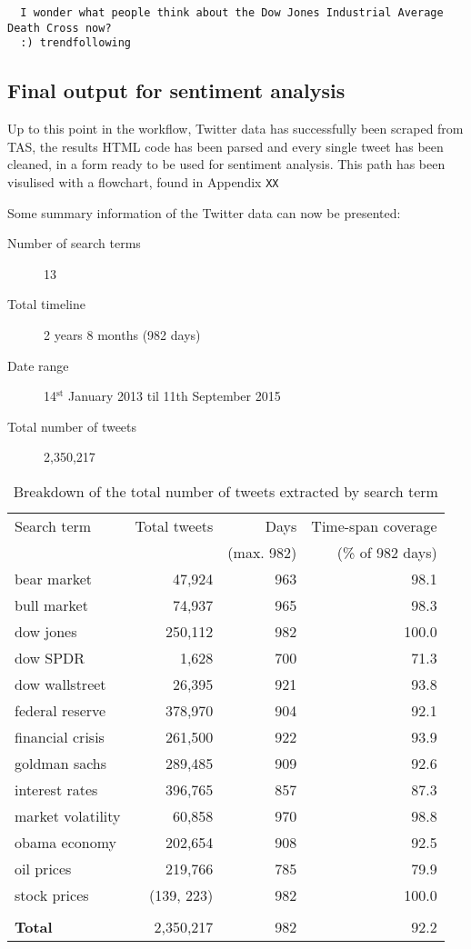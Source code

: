 \documentclass{article}
\begin{document}
\begin{verbatim}
  I wonder what people think about the Dow Jones Industrial Average Death Cross now?
  :) trendfollowing
\end{verbatim}


\subsection{Final output for sentiment analysis}
\label{sec-3-6}

Up to this point in the workflow, Twitter data has successfully been scraped from TAS, the results HTML code has been parsed and every single tweet has been cleaned, in a form ready to be used for sentiment analysis. This path has been visulised with a flowchart, found in Appendix \texttt{XX}

Some summary information of the Twitter data can now be presented:

\begin{description}
\item[{Number of search terms}] 13

\item[{Total timeline}] 2 years 8 months (982 days)

\item[{Date range}] 14$^{\text{st}}$ January 2013 til 11th September 2015

\item[{Total number of tweets}] 2,350,217
\end{description}

\begin{table}[htb]
\centering
\begin{tabular}{l|r|r|r}
Search term & Total tweets & Days & Time-span coverage\\
 &  & (max. 982) & (\% of 982 days)\\
\hline
bear market & 47,924 & 963 & 98.1\\
bull market & 74,937 & 965 & 98.3\\
dow jones & 250,112 & 982 & 100.0\\
dow SPDR & 1,628 & 700 & 71.3\\
dow wallstreet & 26,395 & 921 & 93.8\\
federal reserve & 378,970 & 904 & 92.1\\
financial crisis & 261,500 & 922 & 93.9\\
goldman sachs & 289,485 & 909 & 92.6\\
interest rates & 396,765 & 857 & 87.3\\
market volatility & 60,858 & 970 & 98.8\\
obama economy & 202,654 & 908 & 92.5\\
oil prices & 219,766 & 785 & 79.9\\
stock prices & (139, 223) & 982 & 100.0\\
 &  &  & \\
\textbf{Total} & 2,350,217 & 982 & 92.2\\
\end{tabular}\caption{\label{tab.tweet-breakdown}Breakdown of the total number of tweets extracted by search term}

\end{table}
\end{document}
